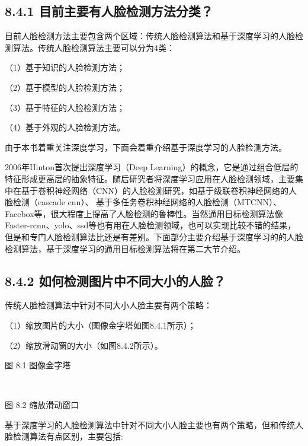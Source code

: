 \subsection{8.4.1
目前主要有人脸检测方法分类？}\label{ux76eeux524dux4e3bux8981ux6709ux4ebaux8138ux68c0ux6d4bux65b9ux6cd5ux5206ux7c7b}

目前人脸检测方法主要包含两个区域：传统人脸检测算法和基于深度学习的人脸检测算法。传统人脸检测算法主要可以分为4类：

（1）基于知识的人脸检测方法；

（2）基于模型的人脸检测方法；

（3）基于特征的人脸检测方法；

（4）基于外观的人脸检测方法。

由于本书着重关注深度学习，下面会着重介绍基于深度学习的人脸检测方法。

2006年Hinton首次提出深度学习（Deep
Learning）的概念，它是通过组合低层的特征形成更高层的抽象特征。随后研究者将深度学习应用在人脸检测领域，主要集中在基于卷积神经网络（CNN）的人脸检测研究，如基于级联卷积神经网络的人脸检测（cascade
cnn）、
基于多任务卷积神经网络的人脸检测（MTCNN）、Facebox等，很大程度上提高了人脸检测的鲁棒性。当然通用目标检测算法像Faster-rcnn、yolo、ssd等也有用在人脸检测领域，也可以实现比较不错的结果，但是和专门人脸检测算法比还是有差别。下面部分主要介绍基于深度学习的的人脸检测算法，基于深度学习的通用目标检测算法将在第二大节介绍。

\subsection{8.4.2
如何检测图片中不同大小的人脸？}\label{ux5982ux4f55ux68c0ux6d4bux56feux7247ux4e2dux4e0dux540cux5927ux5c0fux7684ux4ebaux8138}

传统人脸检测算法中针对不同大小人脸主要有两个策略：

（1）缩放图片的大小（图像金字塔如图8.4.1所示）；

（2）缩放滑动窗的大小（如图8.4.2所示）。

\begin{figure}
\centering
\caption{}
\end{figure}

图 8.1 图像金字塔

​ %

图 8.2 缩放滑动窗口

​
基于深度学习的人脸检测算法中针对不同大小人脸主要也有两个策略，但和传统人脸检测算法有点区别，主要包括:

